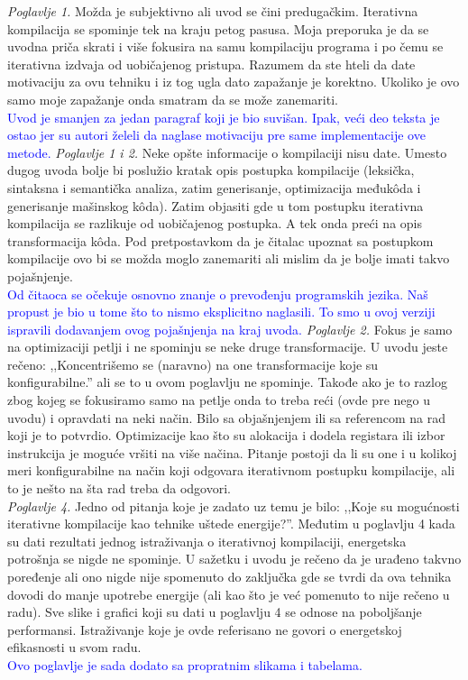 \documentclass[a4paper]{report}
\newcommand{\odgovor}[1]{\textcolor{blue}{#1}}
\begin{document}
\textit{Poglavlje 1.} Možda je subjektivno ali uvod se čini predugačkim. Iterativna kompilacija se spominje tek na kraju petog pasusa. Moja preporuka je da se uvodna priča skrati i više fokusira na samu kompilaciju programa i po čemu se iterativna izdvaja od uobičajenog pristupa. Razumem da ste hteli da date motivaciju za ovu tehniku i iz tog ugla dato zapažanje je korektno. Ukoliko je ovo samo moje zapažanje onda smatram da se može zanemariti. \\
\odgovor{ Uvod je smanjen za jedan paragraf koji je bio suvišan. Ipak, veći deo teksta je ostao jer su autori želeli da naglase motivaciju pre same implementacije ove metode. }
\textit{Poglavlje 1 i 2.} Neke opšte informacije o kompilaciji nisu date. Umesto dugog uvoda bolje bi poslužio kratak opis postupka kompilacije (leksička, sintaksna i semantička analiza, zatim generisanje, optimizacija međukôda i generisanje mašinskog kôda). Zatim objasiti gde u tom postupku iterativna kompilacija se razlikuje od uobičajenog postupka. A tek onda preći na opis transformacija kôda. Pod pretpostavkom da je čitalac upoznat sa postupkom kompilacije ovo bi se možda moglo zanemariti ali mislim da je bolje imati takvo pojašnjenje. \\
\odgovor{ Od čitaoca se očekuje osnovno znanje o prevođenju programskih jezika. Naš propust je bio u tome što to nismo eksplicitno naglasili. To smo u ovoj verziji ispravili dodavanjem ovog pojašnjenja na kraj uvoda. }
\textit{Poglavlje 2.} Fokus je samo na optimizaciji petlji i ne spominju se neke druge transformacije. U uvodu jeste rečeno: ,,Koncentrišemo se (naravno) na one transformacije koje su konfigurabilne.'' ali se to u ovom poglavlju ne spominje. Takođe ako je to razlog zbog kojeg se fokusiramo samo na petlje onda to treba reći (ovde pre nego u uvodu) i opravdati na neki način. Bilo sa objašnjenjem ili sa referencom na rad koji je to potvrdio. Optimizacije kao što su alokacija i dodela registara ili izbor instrukcija je moguće vršiti na više načina. Pitanje postoji da li su one i u kolikoj meri konfigurabilne na način koji odgovara iterativnom postupku kompilacije, ali to je nešto na šta rad treba da odgovori. \\

\textit{Poglavlje 4.} Jedno od pitanja koje je zadato uz temu je bilo: ,,Koje su mogućnosti iterativne kompilacije kao tehnike uštede energije?''. Međutim u poglavlju 4 kada su dati rezultati jednog istraživanja o iterativnoj kompilaciji, energetska potrošnja se nigde ne spominje. U sažetku i uvodu je rečeno da je urađeno takvno poređenje ali ono nigde nije spomenuto do zaključka gde se tvrdi da ova tehnika dovodi do manje upotrebe energije (ali kao što je već pomenuto to nije rečeno u radu). Sve slike i grafici koji su dati u poglavlju 4 se odnose na poboljšanje performansi. Istraživanje koje je ovde referisano ne govori o energetskoj efikasnosti u svom radu. \\
\odgovor { Ovo poglavlje je sada dodato sa propratnim slikama i tabelama. }
\end{document}
